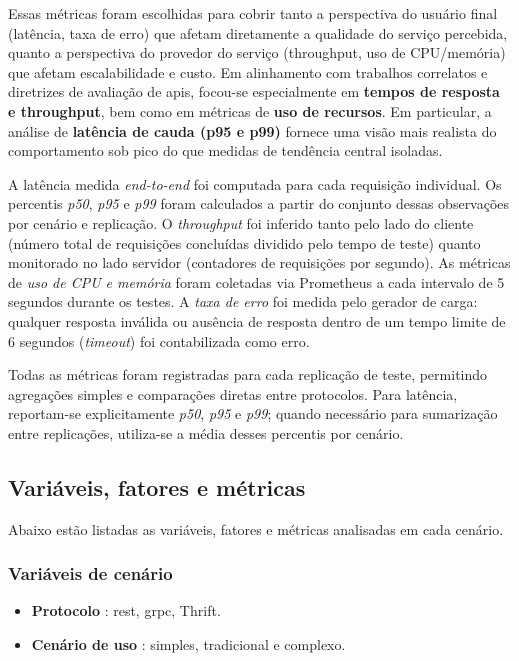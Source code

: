 Essas métricas foram escolhidas para cobrir tanto a perspectiva do usuário final (latência, taxa de erro) que afetam diretamente a qualidade do serviço percebida, quanto a perspectiva do provedor do serviço (throughput, uso de CPU/memória) que afetam escalabilidade e custo. Em alinhamento com trabalhos correlatos e diretrizes de avaliação de \gls{api}s, focou-se especialmente em \textbf{tempos de resposta e throughput}, bem como em métricas de \textbf{uso de recursos}. Em particular, a análise de \textbf{latência de cauda (p95 e p99)} fornece uma visão mais realista do comportamento sob pico do que medidas de tendência central isoladas.

A latência medida \textit{end-to-end} foi computada para cada requisição individual. Os percentis \textit{p50}, \textit{p95} e \textit{p99} foram calculados a partir do conjunto dessas observações por cenário e replicação. O \textit{throughput} foi inferido tanto pelo lado do cliente (número total de requisições concluídas dividido pelo tempo de teste) quanto monitorado no lado servidor (contadores de requisições por segundo). As métricas de \textit{uso de CPU e memória} foram coletadas via Prometheus a cada intervalo de 5 segundos durante os testes. A \textit{taxa de erro} foi medida pelo gerador de carga: qualquer resposta inválida ou ausência de resposta dentro de um tempo limite de 6 segundos (\textit{timeout}) foi contabilizada como erro.

Todas as métricas foram registradas para cada replicação de teste, permitindo agregações simples e comparações diretas entre protocolos. Para latência, reportam-se explicitamente \textit{p50}, \textit{p95} e \textit{p99}; quando necessário para sumarização entre replicações, utiliza-se a média desses percentis por cenário.

\subsection{Variáveis, fatores e métricas}
\label{sec:4-variaveis}

Abaixo estão listadas as variáveis, fatores e métricas analisadas em cada cenário.

\subsubsection*{Variáveis de cenário}
\begin{itemize}
\item \textbf{Protocolo} : {\gls{rest}, \gls{grpc}, Thrift}.
\item \textbf{Cenário de uso} : {simples, tradicional e complexo}.
\end{itemize}

